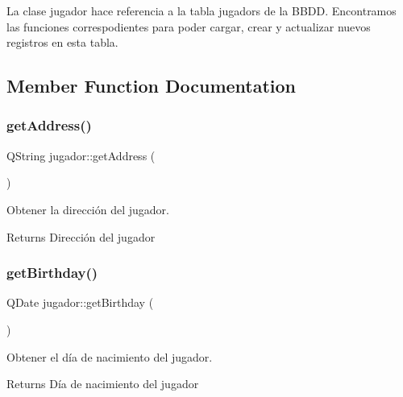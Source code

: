 La clase jugador hace referencia a la tabla \textquotesingle{}jugadors\textquotesingle{} de la B\+B\+DD. Encontramos las funciones correspodientes para poder cargar, crear y actualizar nuevos registros en esta tabla. 

\subsection{Member Function Documentation}
\mbox{\label{classjugador_adb7342524d07d6708414942a82cfa514}} 
\subsubsection{\texorpdfstring{get\+Address()}{getAddress()}}
{\footnotesize\ttfamily Q\+String jugador\+::get\+Address (\begin{DoxyParamCaption}{ }\end{DoxyParamCaption})}



Obtener la dirección del jugador. 

\begin{DoxyReturn}{Returns}
Dirección del jugador 
\end{DoxyReturn}
\mbox{\label{classjugador_a845558cf9e7def7add1d73e9b6812865}} 
\subsubsection{\texorpdfstring{get\+Birthday()}{getBirthday()}}
{\footnotesize\ttfamily Q\+Date jugador\+::get\+Birthday (\begin{DoxyParamCaption}{ }\end{DoxyParamCaption})}



Obtener el día de nacimiento del jugador. 

\begin{DoxyReturn}{Returns}
Día de nacimiento del jugador 
\end{DoxyReturn}
\mbox{\label{classjugador_a326f8dd3d47d3fa8fdb7b38b27c47bc8}} 
